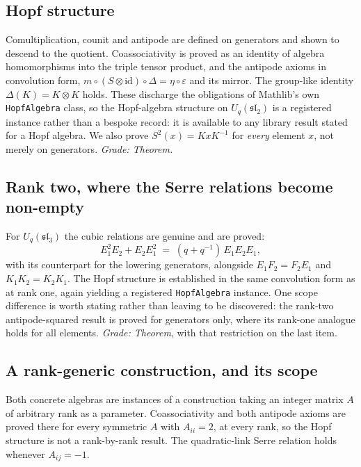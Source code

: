 \documentclass[aps,prx,nofootinbib,superscriptaddress,12pt]{revtex4-2}
\begin{document}
\subsection{Hopf structure}

Comultiplication, counit and antipode are defined on generators and
shown to descend to the quotient. Coassociativity is proved as an
identity of algebra homomorphisms into the triple tensor product, and
the antipode axioms in convolution form,
$m \circ (S \otimes \mathrm{id}) \circ \Delta = \eta \circ \varepsilon$
and its mirror. The group-like identity $\Delta(K) = K \otimes K$ holds.
These discharge the obligations of Mathlib's own \texttt{HopfAlgebra}
class, so the Hopf-algebra structure on $U_q(\mathfrak{sl}_2)$ is a
registered instance rather than a bespoke record: it is available to any
library result stated for a Hopf algebra. We also prove
$S^{2}(x) = KxK^{-1}$ for \emph{every} element $x$, not merely on
generators. \emph{Grade: Theorem.}

\subsection{Rank two, where the Serre relations become non-empty}

For $U_q(\mathfrak{sl}_3)$ the cubic relations are genuine and are
proved:
\begin{equation}
E_1^{2}E_2 + E_2E_1^{2} \;=\; (q + q^{-1})\,E_1E_2E_1 ,
\label{eq:serre3}
\end{equation}
with its counterpart for the lowering generators, alongside
$E_1F_2 = F_2E_1$ and $K_1K_2 = K_2K_1$. The Hopf structure is
established in the same convolution form as at rank one, again yielding
a registered \texttt{HopfAlgebra} instance. One scope difference is
worth stating rather than leaving to be discovered: the rank-two
antipode-squared result is proved for generators only, where its
rank-one analogue holds for all elements. \emph{Grade: Theorem}, with
that restriction on the last item.

\subsection{A rank-generic construction, and its scope}

Both concrete algebras are instances of a construction taking an integer
matrix $A$ of arbitrary rank as a parameter. Coassociativity and both
antipode axioms are proved there for every symmetric $A$ with
$A_{ii} = 2$, at every rank, so the Hopf structure is not a rank-by-rank
result. The quadratic-link Serre relation holds whenever $A_{ij} = -1$.
\end{document}

